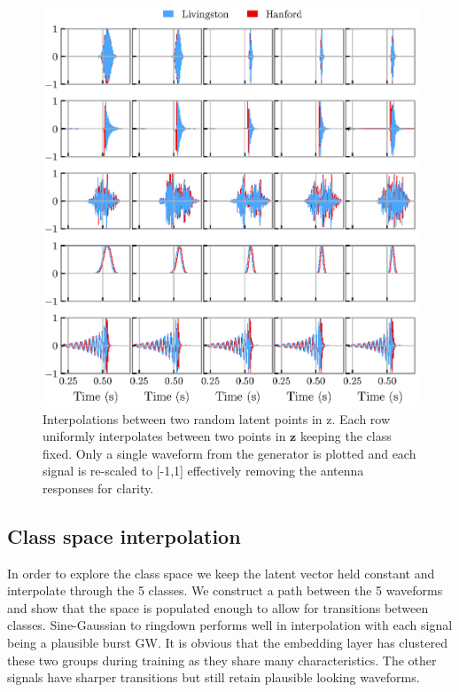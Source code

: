 \documentclass[12pt]{iopart}
\begin{document}
\begin{figure}[ht]
    \centering
    \includegraphics[width=\textwidth]{figures/z_interpolation.eps}
    \caption{Interpolations between two random latent points in z. Each row uniformly interpolates between two points in $\mathbf{z}$ keeping the class fixed. Only a single waveform from the generator is plotted and each signal is re-scaled to [-1,1] effectively removing the antenna responses for clarity.}
    \label{fig:z_interp}
\end{figure}

\subsection{Class space interpolation}
In order to explore the class space we keep the latent vector held constant and interpolate through the 5 classes. We construct a path between the 5 waveforms and show that the space is populated enough to allow for transitions between classes. Sine-Gaussian to ringdown performs well in interpolation with each signal being a plausible burst GW. It is obvious that the embedding layer has clustered these two groups during training as they share many characteristics. The other signals have sharper transitions but still retain plausible looking waveforms.  
\end{document}

